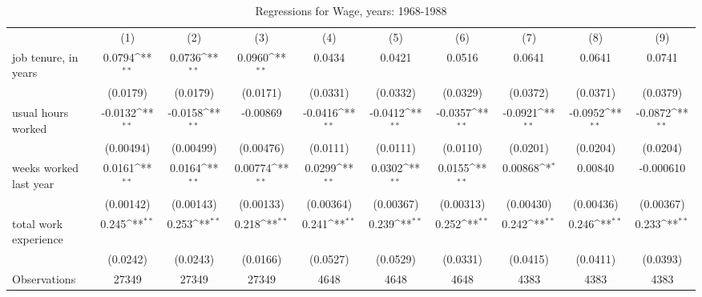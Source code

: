 \documentclass[11pt]{article}
\begin{document}
\begin{landscape}\def\sym#1{\ifmmode^{#1}\else\(^{#1}\)\fi}
\begin{table}
\caption{Regressions for Wage, years: 1968-1988}
\resizebox{\textwidth}{!} {
\begin{tabular}{l*{9}{c}}
\toprule[1.5pt]
                &\multicolumn{1}{c}{(1)}        &\multicolumn{1}{c}{(2)}        &\multicolumn{1}{c}{(3)}        &\multicolumn{1}{c}{(4)}        &\multicolumn{1}{c}{(5)}        &\multicolumn{1}{c}{(6)}        &\multicolumn{1}{c}{(7)}        &\multicolumn{1}{c}{(8)}        &\multicolumn{1}{c}{(9)}        \\
[1em]
job tenure, in years&   0.0794\sym{**}&   0.0736\sym{**}&   0.0960\sym{**}&   0.0434        &   0.0421        &   0.0516        &   0.0641        &   0.0641        &   0.0741        \\
                & (0.0179)        & (0.0179)        & (0.0171)        & (0.0331)        & (0.0332)        & (0.0329)        & (0.0372)        & (0.0371)        & (0.0379)        \\
[1em]
usual hours worked&  -0.0132\sym{**}&  -0.0158\sym{**}& -0.00869        &  -0.0416\sym{**}&  -0.0412\sym{**}&  -0.0357\sym{**}&  -0.0921\sym{**}&  -0.0952\sym{**}&  -0.0872\sym{**}\\
                &(0.00494)        &(0.00499)        &(0.00476)        & (0.0111)        & (0.0111)        & (0.0110)        & (0.0201)        & (0.0204)        & (0.0204)        \\
[1em]
weeks worked last year&   0.0161\sym{**}&   0.0164\sym{**}&  0.00774\sym{**}&   0.0299\sym{**}&   0.0302\sym{**}&   0.0155\sym{**}&  0.00868\sym{*} &  0.00840        &-0.000610        \\
                &(0.00142)        &(0.00143)        &(0.00133)        &(0.00364)        &(0.00367)        &(0.00313)        &(0.00430)        &(0.00436)        &(0.00367)        \\
[1em]
total work experience&    0.245\sym{**}&    0.253\sym{**}&    0.218\sym{**}&    0.241\sym{**}&    0.239\sym{**}&    0.252\sym{**}&    0.242\sym{**}&    0.246\sym{**}&    0.233\sym{**}\\
                & (0.0242)        & (0.0243)        & (0.0166)        & (0.0527)        & (0.0529)        & (0.0331)        & (0.0415)        & (0.0411)        & (0.0393)        \\
[1em]
Observations    &    27349        &    27349        &    27349        &     4648        &     4648        &     4648        &     4383        &     4383        &     4383        \\

\end{tabular}}
\end{table}
\end{landscape}
\end{document}
